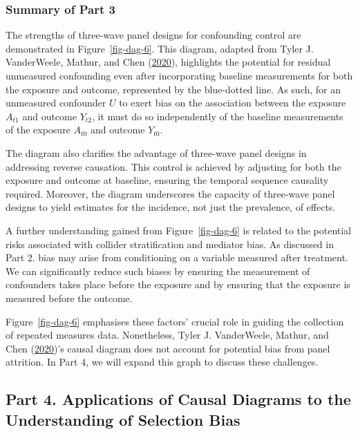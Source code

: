 \documentclass[
  singlecolumn]{article}
\begin{document}
\hypertarget{summary-of-part-3}{%
\subsubsection{Summary of Part 3}\label{summary-of-part-3}}

The strengths of three-wave panel designs for confounding control are
demonstrated in Figure~\ref{fig-dag-6}. This diagram, adapted from Tyler
J. VanderWeele, Mathur, and Chen
(\protect\hyperlink{ref-vanderweele2020}{2020}), highlights the
potential for residual unmeasured confounding even after incorporating
baseline measurements for both the exposure and outcome, represented by
the blue-dotted line. As such, for an unmeasured confounder \(U\) to
exert bias on the association between the exposure \(A_{t1}\) and
outcome \(Y_{t2}\), it must do so independently of the baseline
measurements of the exposure \(A_{t0}\) and outcome \(Y_{t0}\).

The diagram also clarifies the advantage of three-wave panel designs in
addressing reverse causation. This control is achieved by adjusting for
both the exposure and outcome at baseline, ensuring the temporal
sequence causality required. Moreover, the diagram underscores the
capacity of three-wave panel designs to yield estimates for the
incidence, not just the prevalence, of effects.

A further understanding gained from Figure~\ref{fig-dag-6} is related to
the potential risks associated with collider stratification and mediator
bias. As discussed in Part 2. bias may arise from conditioning on a
variable measured after treatment. We can significantly reduce such
biases by ensuring the measurement of confounders takes place before the
exposure and by ensuring that the exposure is measured before the
outcome.

Figure~\ref{fig-dag-6} emphasises these factors' crucial role in guiding
the collection of repeated measures data. Nonetheless, Tyler J.
VanderWeele, Mathur, and Chen
(\protect\hyperlink{ref-vanderweele2020}{2020})'s causal diagram does
not account for potential bias from panel attrition. In Part 4, we will
expand this graph to discuss these challenges.

\hypertarget{part-4.-applications-of-causal-diagrams-to-the-understanding-of-selection-bias}{%
\subsection{Part 4. Applications of Causal Diagrams to the Understanding
of Selection
Bias}\label{part-4.-applications-of-causal-diagrams-to-the-understanding-of-selection-bias}}
\end{document}

